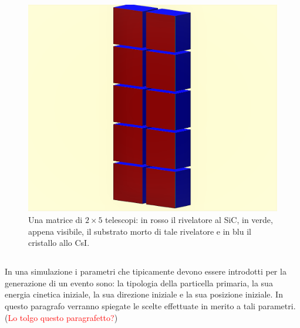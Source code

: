 \begin{figure} [!p]
	\centering
	\includegraphics[width=\textwidth, keepaspectratio]{Grafici/modulo2_ritagliato.png}
	\caption{Una matrice di $2 \times 5$ telescopi: in rosso il rivelatore al SiC, in verde, appena visibile, il substrato morto di tale rivelatore e in blu il cristallo allo CsI.} \label{fig:simulazione_muro}
\end{figure}


\subsection{} \label{par:particelle_primarie}

In una simulazione \geant{} i parametri che tipicamente devono essere introdotti per la generazione di un evento sono: la tipologia della particella primaria, la sua energia cinetica iniziale, la sua direzione iniziale e la sua posizione iniziale.
In questo paragrafo verranno spiegate le scelte effettuate in merito a tali parametri.
(\textcolor{red}{Lo tolgo questo paragrafetto?})

